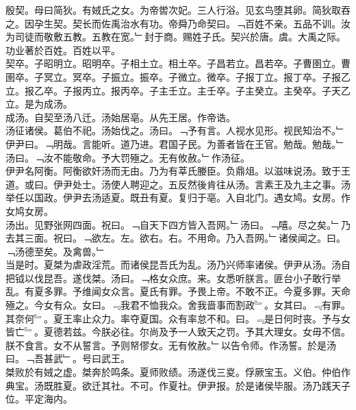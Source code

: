 \documentclass{zhvt-classic}
\begin{document}





\hspace*{2em}殷契。母曰简狄。有娀氏之女。为帝喾次妃。三人行浴。见玄鸟堕其卵。简狄取吞之。因孕生契。契长而佐禹治水有功。帝舜乃命契曰。﹁百姓不亲。五品不训。汝为司徒而敬敷五教。五教在宽。﹂封于商。赐姓子氏。契兴於唐。虞。大禹之际。功业著於百姓。百姓以平。\\
\hspace*{2em}契卒。子昭明立。昭明卒。子相土立。相土卒。子昌若立。昌若卒。子曹圉立。曹圉卒。子冥立。冥卒。子振立。振卒。子微立。微卒。子报丁立。报丁卒。子报乙立。报乙卒。子报丙立。报丙卒。子主壬立。主壬卒。子主癸立。主癸卒。子天乙立。是为成汤。\\
\hspace*{2em}成汤。自契至汤八迁。汤始居亳。从先王居。作帝诰。\\
\hspace*{2em}汤征诸侯。葛伯不祀。汤始伐之。汤曰。﹁予有言。人视水见形。视民知治不。﹂伊尹曰。﹁明哉。言能听。道乃进。君国子民。为善者皆在王官。勉哉。勉哉。﹂汤曰。﹁汝不能敬命。予大罚殛之。无有攸赦。﹂作汤征。\\
\hspace*{2em}伊尹名阿衡。阿衡欲奸汤而无由。乃为有莘氏媵臣。负鼎俎。以滋味说汤。致于王道。或曰。伊尹处士。汤使人聘迎之。五反然後肯往从汤。言素王及九主之事。汤举任以国政。伊尹去汤适夏。既丑有夏。复归于亳。入自北门。遇女鸠。女房。作女鸠女房。\\
\hspace*{2em}汤出。见野张网四面。祝曰。﹁自天下四方皆入吾网。﹂汤曰。﹁嘻。尽之矣。﹂乃去其三面。祝曰。﹁欲左。左。欲右。右。不用命。乃入吾网。﹂诸侯闻之。曰。﹁汤德至矣。及禽兽。﹂\\
\hspace*{2em}当是时。夏桀为虐政淫荒。而诸侯昆吾氏为乱。汤乃兴师率诸侯。伊尹从汤。汤自把钺以伐昆吾。遂伐桀。汤曰。﹁格女众庶。来。女悉听朕言。匪台小子敢行举乱。有夏多罪。予维闻女众言。夏氏有罪。予畏上帝。不敢不正。今夏多罪。天命殛之。今女有众。女曰。﹃我君不恤我众。舍我啬事而割政﹄。女其曰。﹃有罪。其奈何﹄。夏王率止众力。率夺夏国。众有率怠不和。曰。﹃是日何时丧。予与女皆亡﹄。夏德若兹。今朕必往。尔尚及予一人致天之罚。予其大理女。女毋不信。朕不食言。女不从誓言。予则帑僇女。无有攸赦。﹂以告令师。作汤誓。於是汤曰。﹁吾甚武﹂。号曰武王。\\
\hspace*{2em}桀败於有娀之虚。桀奔於鸣条。夏师败绩。汤遂伐三㚇。俘厥宝玉。义伯。仲伯作典宝。汤既胜夏。欲迁其社。不可。作夏社。伊尹报。於是诸侯毕服。汤乃践天子位。平定海内。\\
\end{document}
